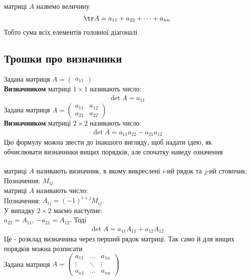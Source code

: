 \documentclass[a4paper, 10pt]{article}
\theoremstyle{theoremdd}
\begin{document}
  \bigskip \\
   матриці $A$ назвемо величину
  \begin{align*}
  \tr A = a_{11} + a_{22} + \dots + a_{nn}
  \end{align*}
  Тобто сума всіх елементів головної діагоналі\\
  	\subsection{Трошки про визначники}
	 Задана матриця $A = \begin{pmatrix} a_{11} \end{pmatrix}$\\
	\textbf{Визначником} матриці $1 \times 1$ називають число:
	\begin{align*}
	\det A = a_{11}
	\end{align*}
	 Задана матриця $A = \begin{pmatrix}
	a_{11} & a_{12} \\
	a_{21} & a_{22}
	\end{pmatrix}$\\
	\textbf{Визначником} матриці $2 \times 2$ називають число:
	\begin{align*}
	\det A = a_{11}a_{22} - a_{21}a_{12}
	\end{align*}
	Цю формулу можна звести до інакшого вигляду, щоб надати ідею, як обчислювати визначники вищих порядків, але спочатку наведу означення\\
	\bigskip \\
	 матриці $A$ називають визначник, в якому викреслені $i$-ий рядок та $j$-ий стовпчик:\\
	Позначення: $M_{ij}$\bigskip \\
	 матриці $A$ називають число:\\
	Позначення: $A_{ij} = (-1)^{i+j} M_{ij}$\bigskip \\
	У випадку $2 \times 2$ маємо наступне: \\
	$a_{22} = A_{11}$, $-a_{21} = A_{12}$. Тоді
	\begin{align*}
	\det A = a_{11}A_{11} + a_{12}A_{12}
	\end{align*}
	Це - розклад визначника через перший рядок матриці. Так само й для вищих порядків можна розписати\\
	 Задана матриця $A = \begin{pmatrix}
	a_{11} & \dots & a_{1n} \\
	\vdots & \ddots & \vdots \\
	a_{n1} & \dots & a_{nn}
	\end{pmatrix}$\\
\end{document}
